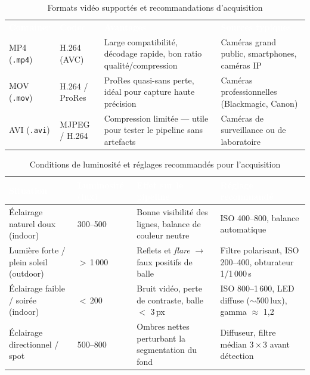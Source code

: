 \begin{table}[H]
  \centering
  \renewcommand{\arraystretch}{1.3}
  \begin{tabularx}{\textwidth}{L{2.8cm} L{3cm} X L{3.5cm}}
    \textcolor{white}{\textbf{Container}} &
    \textcolor{white}{\textbf{Codec}} &
    \textcolor{white}{\textbf{Avantages}} &
    \textcolor{white}{\textbf{Sources typiques}} \\
    MP4 (\texttt{.mp4}) & H.264 (AVC)    & Large compatibilité, décodage rapide, bon ratio qualité/compression & Caméras grand public, smartphones, caméras IP \\
    MOV (\texttt{.mov}) & H.264 / ProRes & ProRes quasi-sans perte, idéal pour capture haute précision         & Caméras professionnelles (Blackmagic, Canon) \\
    AVI (\texttt{.avi}) & MJPEG / H.264  & Compression limitée — utile pour tester le pipeline sans artefacts  & Caméras de surveillance ou de laboratoire \\
  \end{tabularx}
  \caption{Formats vidéo supportés et recommandations d'acquisition}
  \label{tab:video_formats}
\end{table}

\begin{table}[H]
  \centering
  \tablestyle
  \begin{tabularx}{\textwidth}{L{3.5cm} C{2.5cm} X L{4cm}}
    \toprule
    \textcolor{white}{\textbf{Situation}} & \textcolor{white}{\textbf{Luminosité (lux)}} & \textcolor{white}{\textbf{Effet sur le pipeline}} & \textcolor{white}{\textbf{Réglage recommandé}} \\
    \midrule
    Éclairage naturel doux (indoor) & 300–500 & Bonne visibilité des lignes, balance de couleur neutre & ISO 400–800, balance automatique \\
    Lumière forte / plein soleil (outdoor) & $>$\,1\,000 & Reflets et \textit{flare} $\rightarrow$ faux positifs de balle & Filtre polarisant, ISO 200–400, obturateur 1/1\,000\,s \\
    Éclairage faible / soirée (indoor) & $<$\,200 & Bruit vidéo, perte de contraste, balle $<$ 3\,px & ISO 800–1\,600, LED diffuse ($\sim$500\,lux), gamma $\approx$ 1,2 \\
    Éclairage directionnel / spot & 500–800 & Ombres nettes perturbant la segmentation du fond & Diffuseur, filtre médian $3\times3$ avant détection \\
    \bottomrule
  \end{tabularx}
  \caption{Conditions de luminosité et réglages recommandés pour l'acquisition}
  \label{tab:lighting_conditions}
\end{table}

